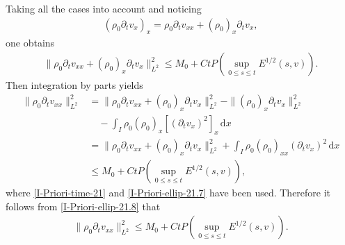 \documentclass[11pt, reqno]{amsart}
\newcommand{\diff}{\mathrm{d}}
\numberwithin{equation}{section}
\begin{document}
Taking all the cases into account and noticing 
\begin{equation*}
	\begin{aligned}
	(\rho_0\partial_tv_x)_x=\rho_0\partial_tv_{xx}+(\rho_0)_x\partial_tv_{x},	
	\end{aligned}
\end{equation*}
one obtains
\begin{equation}\label{I-Priori-ellip-21.7}
\begin{aligned}
\|\rho_0\partial_tv_{xx}+(\rho_0)_x\partial_tv_{x}\|_{L^2}^2
\leq M_0+Ct P(\sup_{0\leq s\leq t}E^{1/2}(s,v)).
\end{aligned}
\end{equation}
Then integration by parts yields
\begin{equation}\label{I-Priori-ellip-21.8}
	\begin{aligned}
		\|\rho_0\partial_tv_{xx}\|_{L^2}^2
		&= \|\rho_0\partial_tv_{xx}+(\rho_0)_x\partial_tv_{x}\|_{L^2}^2
		-\|(\rho_0)_x\partial_tv_{x}\|_{L^2}^2\\
		&\quad-\int_I\rho_0(\rho_0)_x[(\partial_tv_{x})^2]_x\,\diff x\\
		&= \|\rho_0\partial_tv_{xx}+(\rho_0)_x\partial_tv_{x}\|_{L^2}^2
		+\int_I\rho_0(\rho_0)_{xx}(\partial_tv_{x})^2\,\diff x\\
		&\leq M_0+Ct P(\sup_{0\leq s\leq t}E^{1/2}(s,v)),
	\end{aligned}
\end{equation} 
where \eqref{I-Priori-time-21} and \eqref{I-Priori-ellip-21.7} have been used. Therefore it follows from \eqref{I-Priori-ellip-21.8} that
\begin{equation}\label{I-Priori-ellip-22}
	\begin{aligned}
		\|\rho_0\partial_tv_{xx}\|_{L^2}^2
		\leq M_0+Ct P(\sup_{0\leq s\leq t}E^{1/2}(s,v)).
	\end{aligned}
\end{equation}
\end{document}
